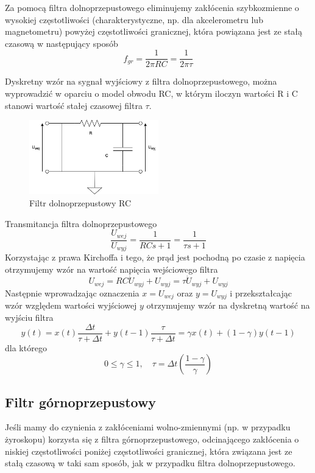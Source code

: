 Za pomocą filtra dolnoprzepustowego eliminujemy zakłócenia szybkozmienne o wysokiej częstotliwości (charakterystyczne, np. dla akcelerometru lub magnetometru) powyżej częstotliwości granicznej, która powiązana jest ze stałą czasową w następujący sposób
$$
    f_{gr} = \frac{1}{2\pi RC} = \frac{1}{2\pi\tau}
$$

Dyskretny wzór na sygnał wyjściowy z filtra dolnoprzepustowego, można wyprowadzić w oparciu o model obwodu RC, w którym iloczyn wartości R i C stanowi wartość stałej czasowej filtra $\tau$.

\begin{figure}[htb!]
    \centering
    \includegraphics[width=0.5\textwidth]{Rysunki/Rozdzial04/FIltr_dolnoprzepustowy.png}
    \caption{Filtr dolnoprzepustowy RC}
    \label{filtr dp}
\end{figure}

Transmitancja filtra dolnoprzepustowego
$$
    \frac{U_{wej}}{U_{wyj}} = \frac{1}{RCs + 1} = \frac{1}{\tau s + 1}
$$
Korzystając z prawa Kirchoffa i tego, że prąd jest pochodną po czasie z napięcia otrzymujemy wzór na wartość napięcia wejściowego filtra
$$
     U_{wej} = RC\Dot{U}_{wyj} + U_{wyj} = \tau \Dot{U}_{wyj} + U_{wyj}
$$
Następnie wprowadzając oznaczenia $x = U_{wej}$ oraz $y = U_{wyj}$ i przekształcając wzór względem wartości wyjściowej $y$ otrzymujemy wzór na dyskretną wartość na wyjściu filtra 
\begin{equation}
    y(t) = x(t)\frac{\Delta t}{\tau + \Delta t} + y(t-1)\frac{\tau}{\tau + \Delta t} = \gamma x(t) + (1 - \gamma)y(t-1)
    \label{wyjscie dp}
\end{equation}
dla którego
$$
    0 \leq \gamma \leq 1,
    \quad
    \tau = \Delta t\left(\frac{1 - \gamma}{\gamma}\right)
$$

\subsection{Filtr górnoprzepustowy}

Jeśli mamy do czynienia z zakłóceniami wolno-zmiennymi (np. w przypadku żyroskopu) korzysta się z filtra górnoprzepustowego, odcinającego zakłócenia o niskiej częstotliwości poniżej częstotliwości granicznej, która związana jest ze stałą czasową w taki sam sposób, jak w przypadku filtra dolnoprzepustowego.
$$
$$

